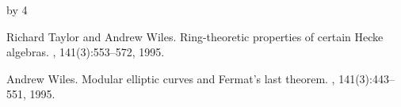 \documentclass[12pt]{scrartcl}
\def\anzspalten{4}
\newlength{\kastenwidth}
\newenvironment{kasten}{%
  \begin{lrbox}{\dummybox}%
    \begin{minipage}{0.96\linewidth}}%
    {\end{minipage}%
  \end{lrbox}%
  \raisebox{-\depth}{\psshadowbox[framesep=1em]{\usebox{\dummybox}}}\\[0.5em]}
\newenvironment{spalte}{%
  \setlength\kastenwidth{1.2\textwidth}
  \divide\kastenwidth by \anzspalten
  \begin{minipage}[t]{\kastenwidth}}{\end{minipage}\hfill}
\begin{document}
\begin{lrbox}{\spalten}
{\begin{spalte}
\begin{kasten}
{\begin{thebibliography}{10}


Richard Taylor and Andrew Wiles.
\newblock Ring-theoretic properties of certain {H}ecke algebras.
, 141(3):553--572, 1995.

Andrew Wiles.
\newblock Modular elliptic curves and {F}ermat's last theorem.
, 141(3):443--551, 1995.


\end{thebibliography}
} %
\end{kasten}

\end{spalte}
    }
    \end{lrbox}
\resizebox*{0.98\textwidth}{!}{%
  \usebox{\spalten}}\hfill\mbox{}\vfill
\end{document}
